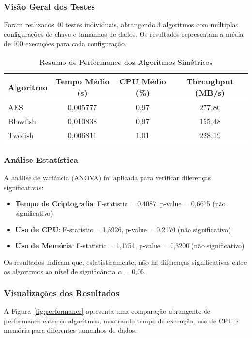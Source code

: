 \documentclass[12pt,a4paper,oneside]{article}
\begin{document}
\subsubsection{Visão Geral dos Testes}

Foram realizados 40 testes individuais, abrangendo 3 algoritmos com múltiplas configurações de chave e tamanhos de dados. Os resultados representam a média de 100 execuções para cada configuração.

\begin{table}[H]
\centering
\caption{Resumo de Performance dos Algoritmos Simétricos}
\label{tab:performance}
\begin{tabular}{lccc}
\toprule
\textbf{Algoritmo} & \textbf{Tempo Médio (s)} & \textbf{CPU Médio (\%)} & \textbf{Throughput (MB/s)} \\
\midrule
AES & 0,005777 & 0,97 & 277,80 \\
Blowfish & 0,010838 & 0,97 & 155,48 \\
Twofish & 0,006811 & 1,01 & 228,19 \\
\bottomrule
\end{tabular}
\end{table}

\subsubsection{Análise Estatística}

A análise de variância (ANOVA) foi aplicada para verificar diferenças significativas:

\begin{itemize}
    \item \textbf{Tempo de Criptografia}: F-statistic = 0,4087, p-value = 0,6675 (não significativo)
    \item \textbf{Uso de CPU}: F-statistic = 1,5926, p-value = 0,2170 (não significativo)
    \item \textbf{Uso de Memória}: F-statistic = 1,1754, p-value = 0,3200 (não significativo)
\end{itemize}

Os resultados indicam que, estatisticamente, não há diferenças significativas entre os algoritmos ao nível de significância $\alpha$ = 0,05.

\subsubsection{Visualizações dos Resultados}

A Figura~\ref{fig:performance} apresenta uma comparação abrangente de performance entre os algoritmos, mostrando tempo de execução, uso de CPU e memória para diferentes tamanhos de dados.
\end{document}
